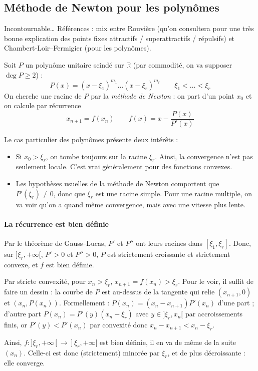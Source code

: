 \documentclass[a4paper, 11pt]{article}
\def\R{\mathbb{R}}
\begin{document}
\newpage


\subsection{Méthode de Newton pour les polynômes}

Incontournable… Références : mix entre Rouvière (qu'on consultera pour une très
bonne explication des points fixes attractifs / superattractifs / répulsifs) et
Chambert-Loir--Fermigier (pour les polynômes).

Soit $P$ un polynôme unitaire scindé sur $\R$ (par commodité, on va supposer
$\deg P \geq 2$) :
\[ P(x) = (x - \xi_1)^{m_1} \ldots (x - \xi_r)^{m_r}
  \qquad \xi_1 < \ldots < \xi_r \]
On cherche une racine de $P$ par la \emph{méthode de Newton} : on part d'un
point $x_0$ et on calcule par récurrence
\[ x_{n+1} = f(x_n) \qquad f(x) = x - \frac{P(x)}{P'(x)} \]

Le cas particulier des polynômes présente deux intérêts :
\begin{itemize}
\item Si $x_0 > \xi_r$, on tombe toujours sur la racine $\xi_r$. Ainsi, la
  convergence n'est pas seulement locale. C'est vrai généralement pour des
  fonctions convexes.
\item Les hypothèses usuelles de la méthode de Newton comportent que $P'(\xi_r)
  \neq 0$, donc que $\xi_r$ est une racine simple. Pour une racine multiple, on
  va voir qu'on a quand même convergence, mais avec une vitesse plus lente.
\end{itemize}

\paragraph{La récurrence est bien définie} Par le théorème de Gauss--Lucas, $P'$
et $P''$ ont leurs racines dans $[\xi_1, \xi_r]$. Donc, sur $]\xi_r, +\infty[$,
$P' > 0$ et $P'' > 0$, $P$ est strictement croissante et strictement convexe, et
$f$ est bien définie.

Par stricte convexité, pour $x_n > \xi_r$, $x_{n+1} = f(x_n) > \xi_r$. Pour le
voir, il suffit de faire un dessin : la courbe de $P$ est au-dessus de la
tangente qui relie $(x_{n+1}, 0)$ et $(x_n, P(x_n))$. Formellement : $P(x_n) =
(x_n - x_{n+1})P'(x_n)$ d'une part ; d'autre part $P(x_n) = P'(y)(x_n - \xi_r)$
avec $y \in ]\xi_r, x_n[$ par accroissements finis, or $P'(y) < P'(x_n)$ par
convexité donc $x_n - x_{n+1} < x_n - \xi_r$.

Ainsi, $f : ]\xi_r, +\infty[ \to ]\xi_r, +\infty[$ est bien définie, il en va de
même de la suite $(x_n)$. Celle-ci est donc (strictement) minorée par $\xi_r$,
et de plus décroissante : elle converge.
\end{document}
